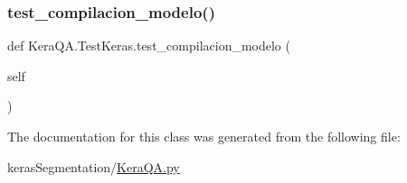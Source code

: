 \mbox{\label{class_kera_q_a_1_1_test_keras_aa9ec17e7cad0fab158b9686266f80ec6}} 
\subsubsection{\texorpdfstring{test\+\_\+compilacion\+\_\+modelo()}{test\_compilacion\_modelo()}}
{\footnotesize\ttfamily def Kera\+Q\+A.\+Test\+Keras.\+test\+\_\+compilacion\+\_\+modelo (\begin{DoxyParamCaption}\item[{}]{self }\end{DoxyParamCaption})}



The documentation for this class was generated from the following file\+:\begin{DoxyCompactItemize}
\item 
keras\+Segmentation/\mbox{\hyperlink{_kera_q_a_8py}{Kera\+Q\+A.\+py}}\end{DoxyCompactItemize}
